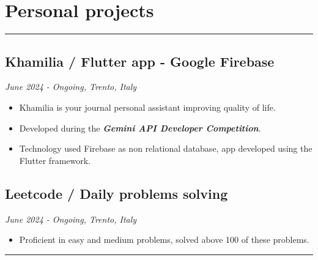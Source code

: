 \documentclass[a4paper,10pt]{article}
\begin{document}
\begin{minipage}[t]{0.25\textwidth}
    \section*{Personal projects}
    \vspace{4.2cm} %
    \rule{0.6cm}{0.3mm}
\end{minipage}
\hfill
\begin{minipage}[t]{0.75\textwidth}
     \subsection*{Khamilia / Flutter app - Google Firebase }
    \textit{June 2024 - Ongoing, Trento, Italy} \\
    \begin{itemize}[leftmargin=1cm]
        \item Khamilia is your journal personal assistant improving quality of life.
        \item Developed during the \textbf{\textit{Gemini API Developer Competition}}.
        \item Technology used Firebase as non relational database, app developed using the Flutter framework.
    \end{itemize}
    \subsection*{Leetcode / Daily problems solving }
    \textit{June 2024 - Ongoing, Trento, Italy} \\
    \begin{itemize}[leftmargin=1cm]
        \item Proficient in easy and medium problems, solved above 100 of these problems.
    \end{itemize}
    \rule{\linewidth}{0.5mm}
\end{minipage}
\end{document}

